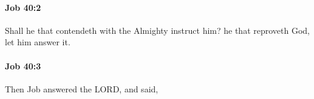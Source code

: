 		\paragraph{Job 40:2} %
			\label{JOB-40-2}

			Shall he that contendeth with the Almighty instruct him? he that reproveth God, let him answer it.


		\paragraph{Job 40:3} %
			\label{JOB-40-3}

			Then Job answered the LORD, and said,



